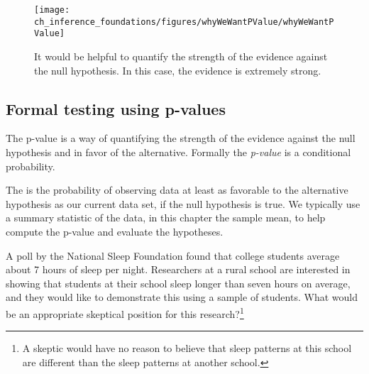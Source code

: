 \begin{figure}[hht]
\centering
\texttt{[image: ch\_inference\_foundations/figures/whyWeWantPValue/whyWeWantPValue]}
\caption{It would be helpful to quantify the strength of the evidence against the null hypothesis. In this case, the evidence is extremely strong.}
\label{whyWeWantPValue}
\end{figure}


\subsection{Formal testing using p-values}
\label{pValue}


The p-value is a way of quantifying the strength of the evidence against the null hypothesis and in favor of the alternative. Formally the \emph{p-value} is a conditional probability.

\begin{termBox}{
The  is the probability of observing data at least as favorable to the alternative hypothesis as our current data set, if the null hypothesis is true. We typically use a summary statistic of the data, in this chapter the sample mean, to help compute the p-value and evaluate the hypotheses.}
\end{termBox}



\begin{exercise} \label{skepticalPerspOfRuralSchoolSleepExercise}
A poll by the National Sleep Foundation found that college students average about 7 hours of sleep per night. Researchers at a rural school are interested in showing that students at their school sleep longer than seven hours on average, and they would like to demonstrate this using a sample of students. What would be an appropriate skeptical position for this research?\footnote{A skeptic would have no reason to believe that sleep patterns at this school are different than the sleep patterns at another school.}
\end{exercise}

